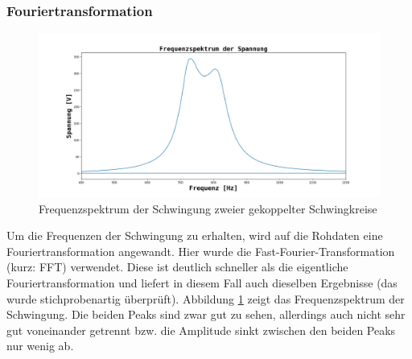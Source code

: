 \documentclass[12pt,a4paper]{article}
\begin{document}
\subsubsection{Fouriertransformation}
\begin{figure}
\begin{center}
\includegraphics[scale=0.4]{Bilder/Schwebung_Frequenzspektrum.png}
\end{center}
\caption[Frequenzspektrum Schwebung]{Frequenzspektrum der Schwingung zweier gekoppelter Schwingkreise}
\label{fig:Schwebung_Frequenzspektrum}
\end{figure}
Um die Frequenzen der Schwingung zu erhalten, wird auf die Rohdaten eine Fouriertransformation angewandt. Hier wurde die Fast-Fourier-Transformation (kurz: FFT) verwendet. Diese ist deutlich schneller als die eigentliche Fouriertransformation und liefert in diesem Fall auch dieselben Ergebnisse (das wurde stichprobenartig überprüft). Abbildung \ref{fig:Schwebung_Frequenzspektrum} zeigt das Frequenzspektrum der Schwingung. Die beiden Peaks sind zwar gut zu sehen, allerdings auch nicht sehr gut voneinander getrennt bzw. die Amplitude sinkt zwischen den beiden Peaks nur wenig ab.
\end{document}
